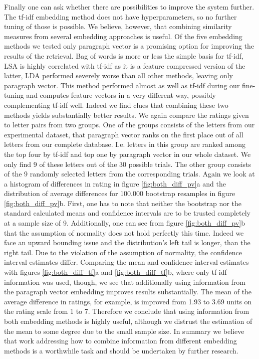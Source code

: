 Finally one can ask whether there are possibilities to improve the system further. The tf-idf embedding method does not have hyperparameters, so no further tuning of those is possible. We believe, however, that combining similarity measures from several embedding approaches is useful. Of the five embedding methods we tested only paragraph vector is a promising option for improving the results of the retrieval. Bag of words is more or less the simple basis for tf-idf, LSA is highly correlated with tf-idf as it is a feature compressed version of the latter, LDA performed severely worse than all other methods, leaving only paragraph vector. This method performed almost as well as tf-idf during our fine-tuning and computes feature vectors in a very different way, possibly complementing tf-idf well. Indeed we find clues that combining these two methods yields substantially better results. We again compare the ratings given to letter pairs from two groups. One of the groups consists of the letters from our experimental dataset, that paragraph vector ranks on the first place out of all letters from our complete database. I.e. letters in this group are ranked among the top four by tf-idf and top one by paragraph vector in our whole dataset. We only find 9 of these letters out of the 30 possible trials. The other group consists of the 9 randomly selected letters from the corresponding trials. Again we look at a histogram of differences in rating in figure \ref{fig:both_diff_pv}a and the distribution of average differences for 100.000 bootstrap resamples in figure \ref{fig:both_diff_pv}b. First, one has to note that neither the bootstrap nor the standard calculated means and confidence intervals are to be trusted completely at a sample size of 9. Additionally, one can see from figure \ref{fig:both_diff_pv}b that the assumption of normality does not hold perfectly this time. Indeed we face an upward bounding issue and the distribution's left tail is longer, than the right tail. Due to the violation of the assumption of normality, the confidence interval estimates differ. Comparing the mean and confidence interval estimates with figures \ref{fig:both_diff_tf}a and \ref{fig:both_diff_tf}b, where only tf-idf information was used, though, we see that additionally using information from the paragraph vector embedding improves results substantially. The mean of the average difference in ratings, for example, is improved from 1.93 to 3.69 units on the rating scale from 1 to 7. Therefore we conclude that using information from both embedding methods is highly useful, although we distrust the estimation of the mean to some degree due to the small sample size. In summary we believe that work addressing how to combine information from different embedding methods is a worthwhile task and should be undertaken by further research.
